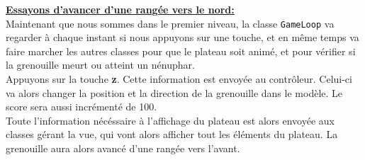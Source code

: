 \documentclass[a4paper, 12pt]{article}
\begin{document}
\underline{\textbf{Essayons d'avancer d'une rangée vers le nord:}} \vspace{0.1cm} \\
Maintenant que nous sommes dans le premier niveau, la classe \texttt{GameLoop} va 
regarder à chaque instant si nous appuyons sur une touche, et en même temps va
faire marcher les autres classes pour que le plateau soit animé, et 
pour vérifier si la grenouille meurt ou atteint un nénuphar. \\
Appuyons sur la touche \textbf{z}. Cette information est envoyée au contrôleur.
Celui-ci va alors changer la position et la direction de la grenouille dans le modèle.
Le score sera aussi incrémenté de 100. \\
Toute l'information nécéssaire à l'affichage du plateau est alors envoyée aux classes
gérant la vue, qui vont alors afficher tout les éléments du plateau. La grenouille aura
alors avancé d'une rangée vers l'avant. 
\end{document}
